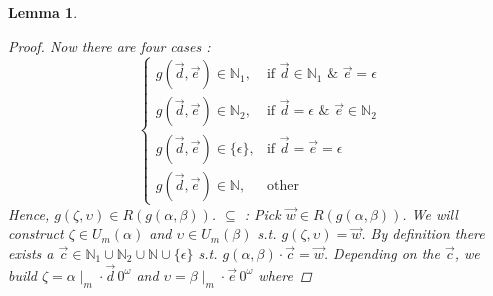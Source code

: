 \documentclass[12pt, a4paper]{scrartcl}
\newtheorem{lemma}[definition]{Lemma}
\begin{document}
\begin{lemma}
\begin{proof}
        \newline Now there are four cases :
        \[
            \begin{cases}
            g(\vec{d}, \vec{e}) \in \mathbb{N}_1, & \text{if } \vec{d} \in \mathbb{N}_1 \text{ \&\ } \vec{e} = \epsilon \\
            g(\vec{d}, \vec{e}) \in \mathbb{N}_2, & \text{if } \vec{d} = \epsilon \text{ \&\ } \vec{e} \in \mathbb{N}_2\\
            g(\vec{d}, \vec{e}) \in \{\epsilon\}, & \text{if } \vec{d} =\vec{e} = \epsilon \\
            g(\vec{d}, \vec{e}) \in \mathbb{N}, & \text{other }
            \end{cases}
        \]
            Hence, $g(\zeta, \upsilon) \in R(g(\alpha,\beta))$. \newline \newline
            $\subseteq$ :  Pick $\vec{w} \in R(g(\alpha,\beta))$. We will construct $\zeta \in U_m(\alpha)$ and $\upsilon \in U_m(\beta)$ s.t. $g(\zeta,\upsilon) = \vec{w}$.
            By definition there exists a $\vec{c} \in \mathbb{N}_1 \cup \mathbb{N}_2 \cup \mathbb{N} \cup \{\epsilon\}$ s.t. $g(\alpha,\beta) \cdot \vec{c} = \vec{w}$. Depending on the $\vec{c}$,
            we build $\zeta = \alpha \mid_m \cdot \vec{d} \, 0^\omega$ and $\upsilon = \beta \mid_m \cdot \vec{e} \, 0^\omega$ where 


\end{proof}
\end{lemma}
\end{document}
